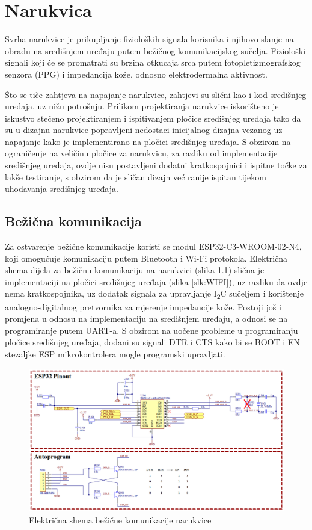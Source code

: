 \chapter{Narukvica}
\label{pog:bracelet}
Svrha narukvice je prikupljanje fizioloških signala korisnika i njihovo slanje na obradu na središnjem uređaju putem bežičnog komunikacijskog sučelja. Fiziološki signali koji će se promatrati su brzina otkucaja srca putem fotopletizmografskog senzora (PPG) i impedancija kože, odnosno elektrodermalna aktivnost.

Što se tiče zahtjeva na napajanje narukvice, zahtjevi su slični kao i kod središnjeg uređaja, uz nižu potrošnju. Prilikom projektiranja narukvice iskorišteno je iskustvo stečeno projektiranjem i ispitivanjem pločice središnjeg uređaja tako da su u dizajnu narukvice popravljeni nedostaci inicijalnog dizajna vezanog uz napajanje kako je implementirano na pločici središnjeg uređaja. S obzirom na ograničenje na veličinu pločice za narukvicu, za razliku od implementacije središnjeg uređaja, ovdje nisu postavljeni dodatni kratkospojnici i ispitne točke za lakše testiranje, s obzirom da je sličan dizajn već ranije ispitan tijekom uhodavanja središnjeg uređaja.

\section{Bežična komunikacija}
Za ostvarenje bežične komunikacije koristi se modul ESP32-C3-WROOM-02-N4, koji omogućuje komunikaciju putem Bluetooth i Wi-Fi protokola. Električna shema dijela za bežičnu komunikaciju na narukvici (slika \ref{slk:BR_WIRELESS}) slična je implementaciji na pločici središnjeg uređaja (slika \ref{slk:WIFI}), uz razliku da ovdje nema kratkospojnika, uz dodatak signala za upravljanje I\textsubscript{2}C sučeljem i korištenje analogno-digitalnog pretvornika za mjerenje impedancije kože. Postoji još i promjena u odnosu na implementaciju na središnjem uređaju, a odnosi se na programiranje putem UART-a. S obzirom na uočene probleme u programiranju pločice središnjeg uređaja, dodani su signali DTR i CTS kako bi se BOOT i EN stezaljke ESP mikrokontrolera mogle programski upravljati.
\begin{figure}
    \centering
    \includegraphics[width=1\textwidth]{Figures/BR_WIRELESS.png}
    \caption{Električna shema bežične komunikacije narukvice}
    \label{slk:BR_WIRELESS}
\end{figure}

